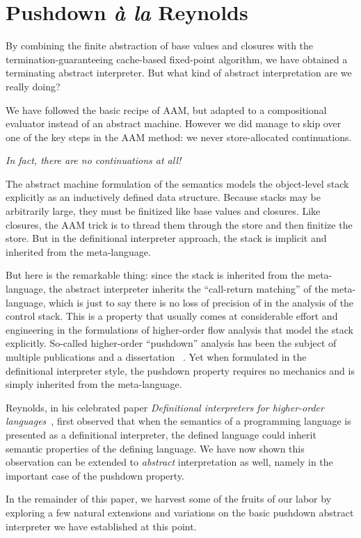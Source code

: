\section{Pushdown \emph{à la} Reynolds}\label{s:reynolds}

By combining the finite abstraction of base values and closures with
the termination-guaranteeing cache-based fixed-point algorithm, we
have obtained a terminating abstract interpreter.  But what kind of
abstract interpretation are we really doing?  

We have followed the basic recipe of AAM, but adapted to a
compositional evaluator instead of an abstract machine.  However we
did manage to skip over one of the key steps in the AAM method:
we never store-allocated continuations.
\begin{center}
\emph{In fact, there are no continuations at all!}
\end{center}
The abstract machine formulation of the semantics models the
object-level stack explicitly as an inductively defined data
structure.  Because stacks may be arbitrarily large, they must be
finitized like base values and closures.  Like closures, the AAM trick
is to thread them through the store and then finitize the store.  But
in the definitional interpreter approach, the stack is implicit and
inherited from the meta-language.

But here is the remarkable thing: since the stack is inherited from
the meta-language, the abstract interpreter inherits the ``call-return
matching'' of the meta-language, which is just to say there is no loss
of precision of in the analysis of the control stack.  This is a
property that usually comes at considerable effort and engineering in
the formulations of higher-order flow analysis that model the stack
explicitly.  So-called higher-order ``pushdown'' analysis has been the
subject of multiple publications and a dissertation~\cite%
{dvanhorn:Vardoulakis2011CFA2%
,dvanhorn:Earl2010Pushdown%
,local:vardoulakis-diss12%
,dvanhorn:VanHorn2012Systematic%
,dvanhorn:Earl2012Introspective%
,dvanhorn:Johnson2014Abstracting%
,dvanhorn:Johnson2014Pushdown%
,local:p4f%
}%
. Yet when formulated in the definitional interpreter style, the pushdown
property requires no mechanics and is simply inherited from the meta-language.

Reynolds, in his celebrated paper \emph{Definitional interpreters for
higher-order languages}~\cite{dvanhorn:reynolds-acm72}, first observed that when
the semantics of a programming language is presented as a definitional
interpreter, the defined language could inherit semantic properties of
the defining language.  We have now shown this observation can be
extended to \emph{abstract} interpretation as well, namely in the
important case of the pushdown property.

In the remainder of this paper, we harvest some of the fruits of our
labor by exploring a few natural extensions and variations on the
basic pushdown abstract interpreter we have established at this point.
